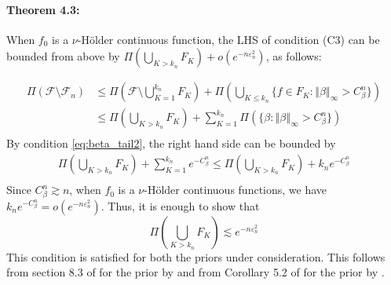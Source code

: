 \documentclass[12pt]{article}
\newcommand{\norm}[1]{\left\Vert#1\right\Vert}
\newcommand{\1}{\mathbb{I}}
\def\mF{\mathcal{F}}
\theoremstyle{plain}
\theoremstyle{definition}
\theoremstyle{remark}
\begin{document}
\paragraph{Theorem 4.3:} When $f_0$ is a $\nu$-H\"{o}lder continuous function, the LHS of condition (C3) can be bounded from above by $\Pi(\bigcup_{K>k_n}F_K)  + o(e^{-n \varepsilon_n^2})$, as follows:

\begin{align*}
  \Pi(\mF \setminus \mF_n)  & \le \Pi(\mF \setminus \bigcup_{K=1}^{k_n} F_K)  + \Pi(\bigcup_{K \le k_n} \{f \in F_K: \norm{\beta}_\infty > C_\beta^n \}) \\
  & \le \Pi(\bigcup_{K>k_n}F_K)  + \sum_{K=1}^{k_n}\Pi(\{\beta: \norm{\beta}_\infty > C_\beta^n\}) \\
  \end{align*}
  By condition \eqref{eq:beta_tail2}, the right hand side can be bounded by
  \begin{align*}
  \Pi(\bigcup_{K>k_n}F_K)  + \sum_{K=1}^{k_n} e^{-C^n_\beta}
  \le \Pi(\bigcup_{K>k_n}F_K)  + k_n e^{-C^n_\beta}\\
  \end{align*}
Since $C_\beta^n \gtrsim n$, when $f_0$ is a $\nu$-H\"{o}lder continuous functions, we have
$k_n e^{-C^n_\beta} = o(e^{-n \varepsilon_n^2})$.
Thus, it is enough to show that
\begin{equation*}
\Pi(\bigcup_{K>k_n}F_K) \lesssim e^{-n\varepsilon_n^2}
\end{equation*}
This condition is satisfied for both the priors under consideration. This follows from section 8.3 of \cite{rockova2020posterior} for the prior by \cite{denison1998bayesian} and from Corollary 5.2 of \cite{rockova2019theory} for the prior by \cite{chipman2010bart}.
\end{document}

